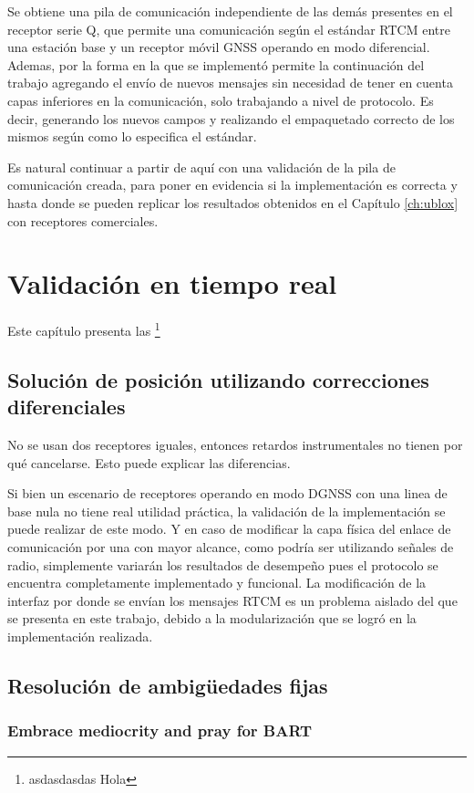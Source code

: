 \documentclass[a4paper,12pt,oneside,onecolumn,final,openright]{book}%
\begin{document}
	Se obtiene una pila de comunicación independiente de las demás presentes en el receptor serie Q, que permite una comunicación según el estándar RTCM entre una estación base y un receptor móvil GNSS operando en modo diferencial. Ademas, por la forma en la que se implementó permite la continuación del trabajo agregando el envío de nuevos mensajes sin necesidad de tener en cuenta capas inferiores en la comunicación, solo trabajando a nivel de protocolo. Es decir, generando los nuevos campos y realizando el empaquetado correcto de los mismos según como lo especifica el estándar.
	
	Es natural continuar a partir de aquí con una validación de la pila de comunicación creada, para poner en evidencia si la implementación es correcta y hasta donde se pueden replicar los resultados obtenidos en el Capítulo \ref{ch:ublox} con receptores comerciales.
\chapter{Validación en tiempo real}
	Este capítulo presenta las \footnote{asdasdasdas Hola}
\section{Solución de posición utilizando correcciones diferenciales}
	No se usan dos receptores iguales, entonces retardos instrumentales no tienen por qué cancelarse. Esto puede explicar las diferencias.
	
	Si bien un escenario de receptores operando en modo DGNSS con una linea de base nula no tiene real utilidad práctica, la validación de la implementación se puede realizar de este modo. Y en caso de modificar la capa física del enlace de comunicación por una con mayor alcance, como podría ser utilizando señales de radio, simplemente variarán los resultados de desempeño pues el protocolo se encuentra completamente implementado y funcional. La modificación de la interfaz por donde se envían los mensajes RTCM es un problema aislado del que se presenta en este trabajo, debido a la modularización que se logró en la implementación realizada.
\section{Resolución de ambigüedades fijas}
\subsection{Embrace mediocrity and pray for BART}
\end{document}

